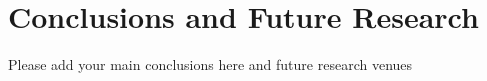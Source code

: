 \section{Conclusions and Future Research}
    Please add your main conclusions here and future research venues